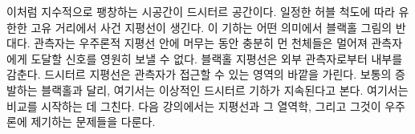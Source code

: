 이처럼 지수적으로 팽창하는 시공간이 드시터르 공간이다. 일정한 허블 척도에 따라 유한한 고유 거리에서 사건 지평선이 생긴다. 이 기하는 어떤 의미에서 블랙홀 그림의 반대다. 관측자는 우주론적 지평선 안에 머무는 동안 충분히 먼 천체들은 멀어져 관측자에게 도달할 신호를 영원히 보낼 수 없다. 블랙홀 지평선은 외부 관측자로부터 내부를 감춘다. 드시터르 지평선은 관측자가 접근할 수 있는 영역의 바깥을 가린다. 보통의 증발하는 블랙홀과 달리, 여기서는 이상적인 드시터르 기하가 지속된다고 본다. 여기서는 비교를 시작하는 데 그친다. 다음 강의에서는 지평선과 그 열역학, 그리고 그것이 우주론에 제기하는 문제들을 다룬다.
